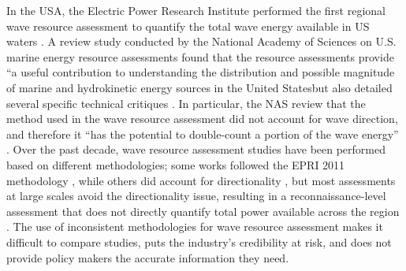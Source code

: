 In the USA, the Electric Power Research Institute performed the first regional wave resource assessment to quantify the total wave energy available in US waters \citep[][hereafter, EPRI 2011]{EPRIwaveresource2011}. A review study conducted by the National Academy of Sciences \DIFdelbegin {}\DIFdelend on U.S. marine energy resource assessments found that \DIFaddbegin {}\DIFaddend the resource assessments provide “a useful contribution to understanding the distribution and possible magnitude of marine and hydrokinetic energy sources in the United States\DIFdelbegin {}\DIFdelend \DIFaddbegin {}\DIFaddend but also detailed several specific technical critiques \citep{nationalresearchcouncilEvaluationDepartmentEnergy2013}. In particular, the NAS review \DIFdelbegin {}\DIFdelend \DIFaddbegin {}\DIFaddend that the method used in the wave resource assessment did not account for wave direction, and therefore it “has the potential to double-count a portion of the wave energy” \citep{nationalresearchcouncilEvaluationDepartmentEnergy2013}. Over the past decade, wave resource assessment studies have been performed based on different methodologies; some works followed the EPRI 2011 methodology \DIFdelbegin {}\DIFdelend \DIFaddbegin {}\DIFaddend , while others did account for directionality \DIFdelbegin {}\DIFdelend \DIFaddbegin {}\DIFaddend , but most assessments at large scales avoid the directionality issue, resulting in a reconnaissance-level assessment that does not directly quantify total power available across the region \citep{iglesiasWaveEnergyPotential2009, neillWavePowerVariability2013, sierraWaveEnergyResource2013, robertsonCharacterizingShoreWave2014, alonsoWaveEnergyResource2015, zhengAssessingChinaSea2013}. The use of inconsistent methodologies for wave resource assessment makes it difficult to compare studies, puts the industry’s credibility at risk, and does not provide policy makers the accurate information they need. 

